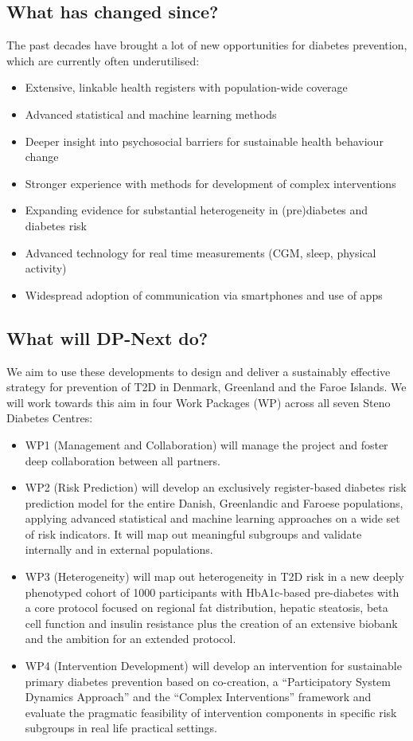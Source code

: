 \documentclass[11pt]{article}
\begin{document}
\subsection{What has changed since?}
\label{sec:org13613ce}
The past decades have brought a lot of new opportunities for diabetes prevention, which are currently
often underutilised:

\begin{itemize}
\item Extensive, linkable health registers with population-wide coverage
\item Advanced statistical and machine learning methods
\item Deeper insight into psychosocial barriers for sustainable health behaviour change
\item Stronger experience with methods for development of complex interventions
\item Expanding evidence for substantial heterogeneity in (pre)diabetes and diabetes risk
\item Advanced technology for real time measurements (CGM, sleep, physical activity)
\item Widespread adoption of communication via smartphones and use of apps
\end{itemize}

\subsection{What will DP-Next do?}
\label{sec:org2743474}
We aim to use these developments to design and deliver a sustainably effective strategy for prevention
of T2D in Denmark, Greenland and the Faroe Islands. We will work towards this aim in four Work Packages
(WP) across all seven Steno Diabetes Centres:

\begin{itemize}
\item WP1 (Management and Collaboration) will manage the project and foster deep collaboration between all
partners.
\item WP2 (Risk Prediction) will develop an exclusively register-based diabetes risk prediction model for
the entire Danish, Greenlandic and Faroese populations, applying advanced statistical and machine
learning approaches on a wide set of risk indicators. It will map out meaningful subgroups and
validate internally and in external populations.
\item WP3 (Heterogeneity) will map out heterogeneity in T2D risk in a new deeply phenotyped cohort of 1000
participants with HbA1c-based pre-diabetes with a core protocol focused on regional fat distribution,
 hepatic steatosis, beta cell function and insulin resistance plus the creation of an extensive
 biobank and the ambition for an extended protocol.
\item WP4 (Intervention Development) will develop an intervention for sustainable primary diabetes
prevention based on co-creation, a “Participatory System Dynamics Approach” and the “Complex
Interventions” framework and evaluate the pragmatic feasibility of intervention components in
specific risk subgroups in real life practical settings.
\end{itemize}
\end{document}

